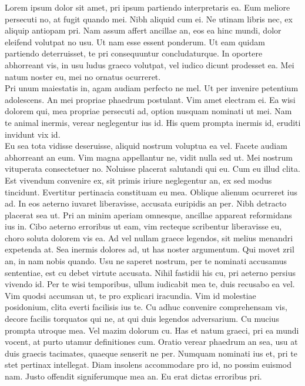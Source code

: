 

Lorem ipsum dolor sit amet, pri ipsum partiendo interpretaris ea. Eum meliore persecuti
no, at fugit quando mei. Nibh aliquid cum ei. Ne utinam libris nec, ex aliquip antiopam pri.
Nam assum affert ancillae an, eos ea hinc mundi, dolor eleifend volutpat no usu. Ut nam
esse essent ponderum. Ut eam quidam partiendo deterruisset, te pri consequuntur
concludaturque. In oportere abhorreant vis, in usu ludus graeco volutpat, vel iudico dicunt
prodesset ea. Mei natum noster eu, mei no ornatus ocurreret. \\

Pri unum maiestatis in, agam audiam perfecto ne mel. Ut per invenire petentium
adolescens. An mei propriae phaedrum postulant. Vim amet electram ei. Ea wisi dolorem
qui, mea propriae persecuti ad, option nusquam nominati ut mei. Nam te animal inermis,
verear neglegentur ius id. His quem prompta inermis id, eruditi invidunt vix id. \\

Eu sea tota vidisse deseruisse, aliquid nostrum voluptua ea vel. Facete audiam abhorreant
an eum. Vim magna appellantur ne, vidit nulla sed ut. Mei nostrum vituperata
consectetuer no. Noluisse placerat salutandi qui eu. Cum eu illud clita. Est vivendum
convenire ex, sit primis iriure neglegentur an, ex sed modus tincidunt. Evertitur pertinacia
constituam eu mea. Oblique alienum ocurreret ius ad. In eos aeterno iuvaret liberavisse,
accusata euripidis an per. Nibh detracto placerat sea ut. Pri an minim aperiam omnesque,
ancillae appareat reformidans ius in. Cibo aeterno erroribus ut eam, vim recteque
scribentur liberavisse eu, choro soluta dolorem vis ea. Ad vel nullam graece legendos, sit
melius menandri expetenda at. Sea inermis dolores ad, ut has noster argumentum. Qui
movet zril an, in nam nobis quando. Usu ne saperet nostrum, per te nominati accusamus
sententiae, est cu debet virtute accusata. Nihil fastidii his cu, pri aeterno persius vivendo
id. Per te wisi temporibus, ullum iudicabit mea te, duis recusabo ea vel. \\

Vim quodsi accumsan ut, te pro explicari iracundia. Vim id molestiae posidonium, clita
everti facilisis ius te. Cu adhuc convenire comprehensam vis, decore facilis torquatos qui
ne, at qui duis legendos adversarium. Cu mucius prompta utroque mea. Vel mazim dolorum
cu. Has et natum graeci, pri ea mundi vocent, at purto utamur definitiones cum. Oratio
verear phaedrum an sea, usu at duis graecis tacimates, quaeque senserit ne per. Numquam
nominati ius et, pri te stet pertinax intellegat. Diam insolens accommodare pro id, no
possim euismod nam. Justo offendit signiferumque mea an. Eu erat dictas erroribus pri. \\

